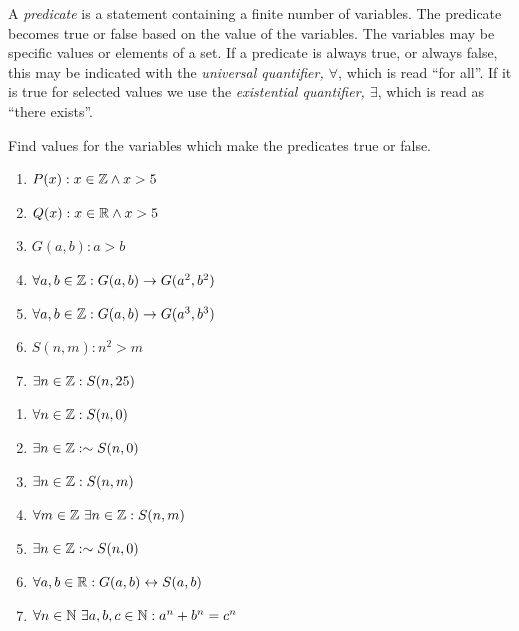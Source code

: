 \begin{defn}
    A \emph{predicate} is a statement containing a finite number of variables. The predicate becomes true or false based on the value of the variables.  The variables may be specific values or elements of a set.  If a predicate is always true, or always false, this may be indicated with the \emph{universal quantifier, \(\forall\)}, which is read ``for all''.  If it is true for selected values we use the \emph{existential quantifier, \(\exists\)}, which is read as ``there exists''.
\end{defn}


\begin{practiceprob}
Find values for the variables which make the predicates true or false.
\begin{sides}
    \begin{enumerate}
    \setlength{\itemsep}{40pt}
        \item \(P(x): x\in\mbox{$\mathbb{Z}$} \wedge x>5\)
        \item \(Q(x): x\in\mbox{$\mathbb{R}$} \wedge x>5\)
        \item \(G(a,b):  a>b\)
        \item \(\forall a,b\in\mbox{$\mathbb{Z}$}: G(a,b) \rightarrow G(a^2,b^2)\)
        \item \(\forall a,b\in\mbox{$\mathbb{Z}$}: G(a,b) \rightarrow G(a^3,b^3)\)
        \item \(S(n,m): n^2>m\)
        \item \(\exists n\in\mbox{$\mathbb{Z}$}: S(n,25)\)
    \end{enumerate}
\tcblower
    \begin{enumerate}[start=8]
    \setlength{\itemsep}{40pt}
        \item \(\forall n\in\mbox{$\mathbb{Z}$}: S(n,0)\)
        \item \(\exists n\in\mbox{$\mathbb{Z}$}: \sim S(n,0)\)
        \item \(\exists n\in\mbox{$\mathbb{Z}$}: S(n,m)\)
        \item \(\forall m\in\mbox{$\mathbb{Z}$}\ \exists n\in\mbox{$\mathbb{Z}$}: S(n,m)\)
        \item \(\exists n\in\mbox{$\mathbb{Z}$}: \sim S(n,0)\)
        \item \(\forall a,b\in \mbox{$\mathbb{R}$}: G(a,b)\leftrightarrow S(a,b)\)
        \item \(\forall n\in\mbox{$\mathbb{N}$}\ \exists a,b,c\in\mbox{$\mathbb{N}$}: a^n+b^n=c^n\)
    \end{enumerate}
    \vspace{40pt}
\end{sides}
\end{practiceprob}


